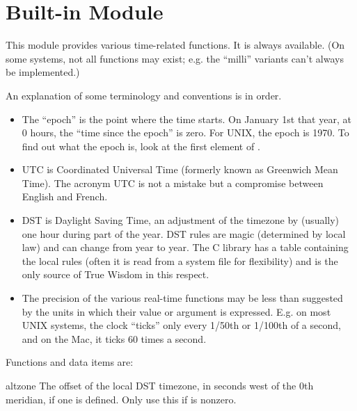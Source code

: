 \section{Built-in Module }

This module provides various time-related functions.
It is always available.  (On some systems, not all functions may
exist; e.g. the ``milli'' variants can't always be implemented.)

An explanation of some terminology and conventions is in order.

\begin{itemize}

\item
The ``epoch'' is the point where the time starts.  On January 1st that
year, at 0 hours, the ``time since the epoch'' is zero.  For UNIX, the
epoch is 1970.  To find out what the epoch is, look at the first
element of .

\item
UTC is Coordinated Universal Time (formerly known as Greenwich Mean
Time).  The acronym UTC is not a mistake but a compromise between
English and French.

\item
DST is Daylight Saving Time, an adjustment of the timezone by
(usually) one hour during part of the year.  DST rules are magic
(determined by local law) and can change from year to year.  The C
library has a table containing the local rules (often it is read from
a system file for flexibility) and is the only source of True Wisdom
in this respect.

\item
The precision of the various real-time functions may be less than
suggested by the units in which their value or argument is expressed.
E.g. on most UNIX systems, the clock ``ticks'' only every 1/50th or
1/100th of a second, and on the Mac, it ticks 60 times a second.

\end{itemize}

Functions and data items are:

\renewcommand{\indexsubitem}{(in module time)}

\begin{datadesc}{altzone}
The offset of the local DST timezone, in seconds west of the 0th
meridian, if one is defined.  Only use this if  is
nonzero.
\end{datadesc}


